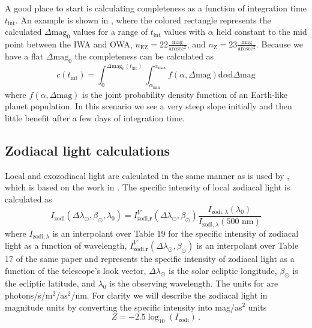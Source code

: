 A good place to start is calculating completeness
as a function of integration time $t_\textrm{int}$. An example
is shown in , where the colored rectangle
represents the calculated $\Delta\textrm{mag}_0$ values for a range of
$t_\textrm{int}$ values with $\alpha$ held constant to the mid point between
the IWA and OWA, $n_\textrm{EZ}=22 \frac{\textrm{mag}}{\textrm{arcsec}^2}$, and
$n_\textrm{Z}=23 \frac{\textrm{mag}}{\textrm{arcsec}^2}$. Because we have a
flat $\Delta\textrm{mag}_0$ the completeness can be calculated as
\begin{equation}
  c(t_\textrm{int}) = \int_{0}^{\Delta\textrm{mag}_0(t_\textrm{int})} 
  \int_{\alpha_\textrm{min}}^{\alpha_\textrm{max}} 
  f(\alpha, \Delta\textrm{mag})\textrm{d}\alpha \textrm{d}\Delta\textrm{mag}
  \label{eq:flat_comp_integral}
\end{equation}
where $f(\alpha, \Delta\textrm{mag})$ is the joint probability density function 
of an Earth-like planet population. In this scenario we see a very steep slope
initially and then little benefit after a few days of integration time.




\subsection{Zodiacal light calculations}

Local and exozodiacal light are calculated in the same manner as is used by
, which is based on the work in \citet{leinert1997Reference1998,
starkMaximizingExoEarthCandidate2014,starkLowerLimitsAperture2015,
keithlyOptimalScheduling2020}. The specific intensity of local zodiacal
light is calculated as
\begin{equation}
  I_\textrm{zodi}(\Delta \lambda_\odot, \beta_\odot, \lambda_0) = 
  I_{\textrm{zodi}, \textbf{r}}^V(\Delta \lambda_\odot, \beta_\odot) 
\frac{I_{\textrm{zodi}, \lambda} (\lambda_0)}{I_{\textrm{zodi}, \lambda}(\textrm{500 nm})}
  \label{eq:local_zodi}
\end{equation}
where $I_{\textrm{zodi}, \lambda}$ is an interpolant over
\citet{leinert1997Reference1998} Table 19 for the specific intensity of
zodiacal light as a function of wavelength, $I_{\textrm{zodi},
\textbf{r}}^V(\Delta \lambda_\odot, \beta_\odot)$ is an interpolant over Table 17 of the same
paper and represents the specific intensity of zodiacal light as a function of
the telescope's look vector, $\Delta \lambda_\odot$ is the solar ecliptic
longitude, $\beta_\odot$ is the ecliptic latitude, and $\lambda_0$ is the
observing wavelength. The units for  are photons/s/m$^2$/as$^2$/nm.
For clarity we will describe the zodiacal light in magnitude units by converting
the specific intensity into mag/as$^2$ units
\begin{equation}
  Z = -2.5 \log_{10}(I_\textrm{zodi}) \,.
  \label{eq:zodi_mag}
\end{equation}

